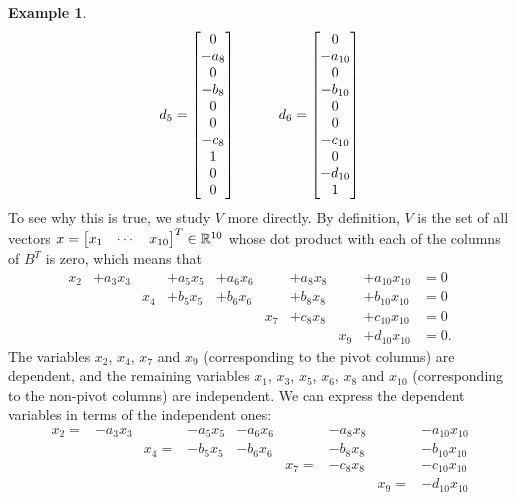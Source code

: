\documentclass[reqno]{amsart}
\theoremstyle{definition}
\newtheorem{example}[theorem]{Example}
\begin{document}
\begin{example}
\[     d_5 = \left[\begin{matrix} 0 \\ -a_8    \\  0  \\ -b_8    \\  0  \\  0  \\ -c_8    \\  1  \\ 0       \\  0  \end{matrix}\right] \hspace{3em}
     d_6 = \left[\begin{matrix} 0 \\ -a_{10} \\  0  \\ -b_{10} \\  0  \\  0  \\ -c_{10} \\  0  \\ -d_{10} \\  1  \end{matrix}\right]
 \]
 To see why this is true, we study $V$ more directly.  By definition,
 $V$ is the set of all vectors
 $x=\left[\begin{matrix} x_1&\cdots&x_{10}\end{matrix}\right]^T\in{\mathbb{R}}^{10}$ whose dot product with
 each of the columns of $B^T$ is zero, which means that
 \[ \begin{array}{cccccccccc}
  x_2 & +a_3x_3 &     & + a_5x_5 & + a_6x_6 &     & + a_8x_8 &     & + a_{10}x_{10} & = 0 \\
      &         & x_4 & + b_5x_5 & + b_6x_6 &     & + b_8x_8 &     & + b_{10}x_{10} & = 0 \\
      &         &     &          &          & x_7 & + c_8x_8 &     & + c_{10}x_{10} & = 0 \\
      &         &     &          &          &     &          & x_9 & + d_{10}x_{10} & = 0.
 \end{array}\]
 The variables $x_2$, $x_4$, $x_7$ and $x_9$ (corresponding to the
 pivot columns) are dependent, and the remaining variables $x_1$,
 $x_3$, $x_5$, $x_6$, $x_8$ and $x_{10}$ (corresponding to the
 non-pivot columns) are independent.  We can express the dependent
 variables in terms of the independent ones:
 \[ \begin{array}{ccccccccc}
  x_2= & -a_3x_3 &      & - a_5x_5 & - a_6x_6 &      & - a_8x_8 &      & - a_{10}x_{10} \\
       &         & x_4= & - b_5x_5 & - b_6x_6 &      & - b_8x_8 &      & - b_{10}x_{10} \\
       &         &      &          &          & x_7= & - c_8x_8 &      & - c_{10}x_{10} \\
       &         &      &          &          &      &          & x_9= & - d_{10}x_{10}

\end{array}\]
\end{example}
\end{document}
